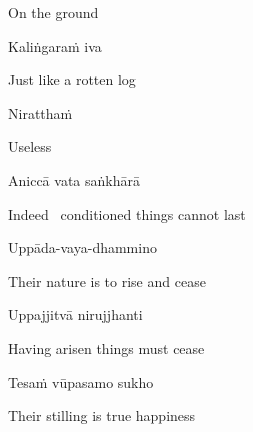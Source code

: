 \begin{english}
  On the ground
\end{english}

Kaliṅgaraṁ iva

\begin{english}
  Just like a rotten log
\end{english}

Niratthaṁ

\begin{english}
  Useless\hyperlink{endnote104-appendix}{\hypertarget{endnote104-body}{}}
\end{english}

\suttaRef{[Dhp 41]}

Aniccā vata saṅkhārā

\begin{english}
  Indeed \breathmark\ conditioned things cannot last
\end{english}

Uppāda-vaya-dhammino

\begin{english}
  Their nature is to rise and cease\hyperlink{endnote105-appendix}{\hypertarget{endnote105-body}{}}
\end{english}

Uppajjitvā nirujjhanti

\begin{english}
  Having arisen things must cease
\end{english}

Tesaṁ vūpasamo sukho

\begin{english}
  Their stilling is true happiness
\end{english}

\suttaRef{[Trad]}

